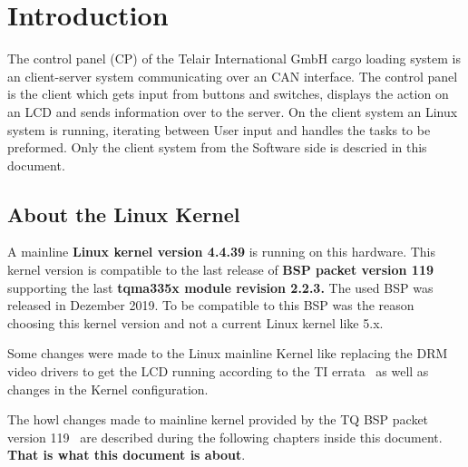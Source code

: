 \chapter{Introduction}\label{chp:einleitung}
The control panel (CP) of the Telair International GmbH cargo loading system is
an client-server system communicating over an CAN interface. The control panel
is the client which gets input from buttons and switches, displays the action on
an LCD and sends information over to the server. On the client system an Linux
system is running, iterating between User input and handles the tasks  to be
preformed.  Only the client system from the Software side is descried in this
document.

\section{About the Linux Kernel}%

A mainline \textbf{Linux kernel version 4.4.39} is running on this hardware.
This kernel version is compatible to the last release of \textbf{\gls{BSP}
packet version 119} supporting the last \textbf{tqma335x module revision 2.2.3.}
The used \gls{BSP} was released in Dezember 2019. To be compatible to this
BSP was the reason choosing this kernel version and not a current Linux kernel
like 5.x.

Some changes were made to the Linux mainline Kernel like replacing the \gls{DRM}
video drivers to get the LCD running according to the TI
errata~\cite{TI_am335x_errata} as well as changes in the Kernel configuration.

The howl changes made to mainline kernel provided by the TQ BSP packet version
119~\cite{tq_bsp119} are described during the following chapters inside this
document. \textbf{That is what this document is about}.


